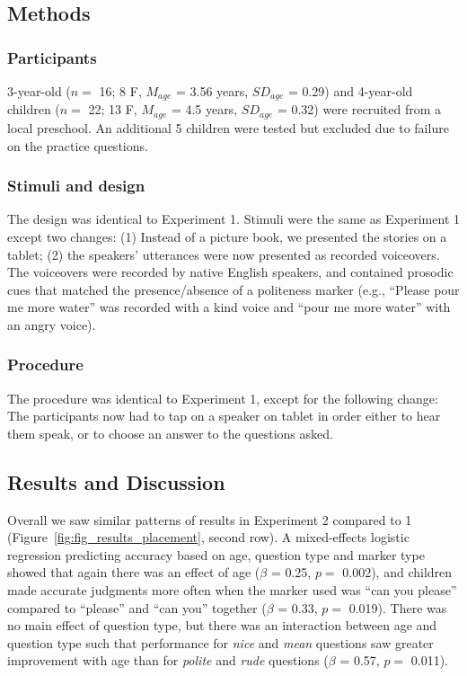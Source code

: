 \documentclass[10pt, letterpaper]{article}
\begin{document}
\subsection{Methods}\label{methods}

\subsubsection{Participants}\label{participants-1}

3-year-old (\(n=\) 16; 8 F, \(M_{age}\) = 3.56 years, \(SD_{age}\) =
0.29) and 4-year-old children (\(n=\) 22; 13 F, \(M_{age}\) = 4.5 years,
\(SD_{age}\) = 0.32) were recruited from a local preschool. An
additional 5 children were tested but excluded due to failure on the
practice questions.

\subsubsection{Stimuli and design}\label{stimuli-and-design-1}

The design was identical to Experiment 1. Stimuli were the same as
Experiment 1 except two changes: (1) Instead of a picture book, we
presented the stories on a tablet; (2) the speakers' utterances were now
presented as recorded voiceovers. The voiceovers were recorded by native
English speakers, and contained prosodic cues that matched the
presence/absence of a politeness marker (e.g., ``Please pour me more
water'' was recorded with a kind voice and ``pour me more water'' with
an angry voice).

\subsubsection{Procedure}\label{procedure-1}

The procedure was identical to Experiment 1, except for the following
change: The participants now had to tap on a speaker on tablet in order
either to hear them speak, or to choose an answer to the questions
asked.

\subsection{Results and Discussion}\label{results-and-discussion-1}

Overall we saw similar patterns of results in Experiment 2 compared to 1
(Figure~\ref{fig:fig_results_placement}, second row). A mixed-effects
logistic regression predicting accuracy based on age, question type and
marker type showed that again there was an effect of age (\(\beta\) =
0.25, \(p =\) 0.002), and children made accurate judgments more often
when the marker used was ``can you please'' compared to ``please'' and
``can you'' together (\(\beta\) = 0.33, \(p =\) 0.019). There was no
main effect of question type, but there was an interaction between age
and question type such that performance for \emph{nice} and \emph{mean}
questions saw greater improvement with age than for \emph{polite} and
\emph{rude} questions (\(\beta\) = 0.57, \(p =\) 0.011).
\end{document}
